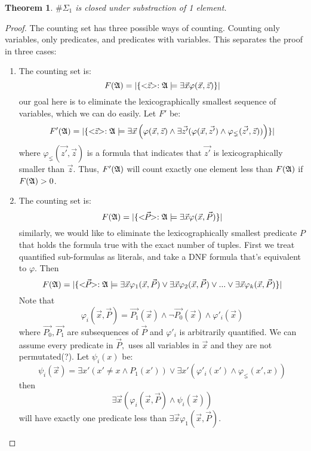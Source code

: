 \documentclass[12pt]{article}
\def\A{{\frak A}}
\newtheorem{theo}{Theorem}
\begin{document}
\begin{theo}
$\#\Sigma_1$ is closed under substraction of 1 element.
\end{theo}
\begin{proof}
The counting set has three possible ways of counting. Counting only variables, only predicates, and predicates with variables. This separates the proof in three cases:
\begin{enumerate}
\item The counting set is:
$$
F(\A) = \vert \{ <\!\!\vec{z}\!\!> :\A \models \exists \vec{x} \varphi(\vec{x},\vec{z}) \} \vert
$$
our goal here is to eliminate the lexicographically smallest sequence of variables, which we can do easily. Let $F'$ be:
$$
F'(\A) = \vert \{ <\!\!\vec{z}\!\!> :\A \models \exists \vec{x}\left( \varphi(\vec{x},\vec{z}) \wedge \exists \vec{z'} (\varphi(\vec{x},\vec{z'}) \wedge \varphi_{\lneq}(\vec{z'},\vec{z} ) ) \right) \} \vert
$$
where $\varphi_{\lneq}(\vec{z'},\vec{z})$ is a formula that indicates that $\vec{z'}$ is lexicographically smaller than $\vec{z}$. Thus, $F'(\A)$ will count exactly one element less than $F(\A)$ if $F(\A)>0$.
\item The counting set is:
$$
F(\A) = \vert \{ <\!\!\vec{P}\!\!> :\A \models \exists \vec{x} \varphi(\vec{x},\vec{P}) \} \vert
$$
similarly, we would like to eliminate the lexicographically smallest predicate $P$ that holds the formula true with the exact number of tuples. First we treat quantified sub-formulas as literals, and take a DNF formula that's equivalent to $\varphi$. Then
$$
F(\A) = \vert \{ <\!\!\vec{P}\!\!> :\A \models 
\exists \vec{x} \varphi_1(\vec{x},\vec{P}) \vee
\exists \vec{x} \varphi_2(\vec{x},\vec{P}) \vee
... \vee
\exists \vec{x} \varphi_k(\vec{x},\vec{P})
 \} \vert
$$
Note that
$$
\varphi_i(\vec{x},\vec{P}) = \vec{P_1}(\vec{x}) \wedge \neg \vec{P_0}(\vec{x}) \wedge \varphi'_i(\vec{x})
$$
where $\vec{P_0},\vec{P_1}$ are subsequences of $\vec{P}$ and $\varphi'_i$ is arbitrarily quantified. We can assume every predicate in $\vec{P},$ uses all variables in $\vec{x}$ and they are not permutated(?). Let $\psi_i(x)$ be:
$$
\psi_i(\vec{x}) = \exists x' (x' \neq x \wedge P_1(x')) \vee \exists x' (\varphi'_i(x') \wedge \varphi_{\lneq}(x',x))
$$
then 
$$
\exists \vec{x} \left( \varphi_i(\vec{x},\vec{P}) \wedge \psi_i(\vec{x}) \right)
$$
will have exactly one predicate less than $\exists \vec{x} \varphi_1(\vec{x},\vec{P})$.
\end{enumerate}
\end{proof}
\end{document}
